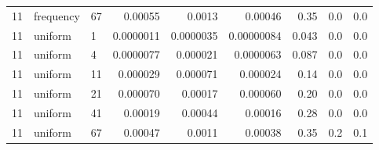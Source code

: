 \begin{tabular}{rllrrrrrr}
11 & frequency & 67 & 0.00055 & 0.0013 & 0.00046 & 0.35 & 0.0 & 0.0 \\
11 & uniform & 1 & 0.0000011 & 0.0000035 & 0.00000084 & 0.043 & 0.0 & 0.0 \\
11 & uniform & 4 & 0.0000077 & 0.000021 & 0.0000063 & 0.087 & 0.0 & 0.0 \\
11 & uniform & 11 & 0.000029 & 0.000071 & 0.000024 & 0.14 & 0.0 & 0.0 \\
11 & uniform & 21 & 0.000070 & 0.00017 & 0.000060 & 0.20 & 0.0 & 0.0 \\
11 & uniform & 41 & 0.00019 & 0.00044 & 0.00016 & 0.28 & 0.0 & 0.0 \\
11 & uniform & 67 & 0.00047 & 0.0011 & 0.00038 & 0.35 & 0.2 & 0.1 \\
\bottomrule
\end{tabular}
